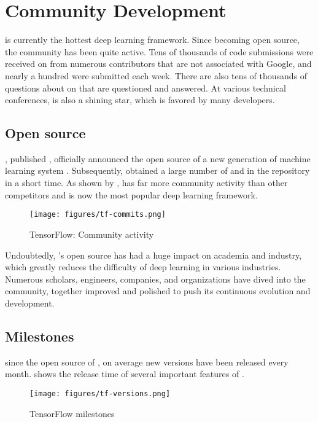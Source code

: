 \section{Community Development}
\begin{content}
\tf{} is currently the hottest deep learning framework. Since becoming open source, the \tf{} community has been quite active. Tens of thousands of code submissions were received on  from numerous contributors that are not associated with {Google}, and nearly a hundred  were submitted each week. There are also tens of thousands of questions about \tf{} on  that are questioned and answered. At various technical conferences, \tf{} is also a shining star, which is favored by many developers.


\subsection{Open source}
,  published , officially announced the open source of a new generation of machine learning system  . Subsequently,  obtained a large number of  and  in the  repository in a short time. As shown by ,  has far more community activity than other competitors and is now the most popular deep learning framework.
\begin{figure}[H]
  \centering
  \texttt{[image: figures/tf-commits.png]}
  \caption{TensorFlow: Community activity}
  \label{fig:tf-commits}
\end{figure}

Undoubtedly, 's open source has had a huge impact on academia and industry, which greatly reduces the difficulty of deep learning in various industries. Numerous scholars, engineers, companies, and organizations have dived into the  community, together improved and polished  to push its continuous evolution and development.


\subsection{Milestones}
\tf{} since the open source of , on average new versions have been released every month.  shows the release time of several important features of \tf{}.
\begin{figure}[!htbp]
  \centering
  \texttt{[image: figures/tf-versions.png]}
  \caption{TensorFlow milestones}
  \label{fig:tf-versions}
\end{figure}



\end{content}
